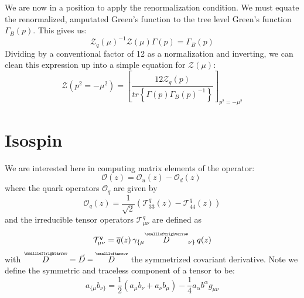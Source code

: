\documentclass[11pt, oneside]{article}   	%
\theoremstyle{definition}
\newcommand{\cev}[1]{\overset{\scriptscriptstyle\smallleftarrow}{#1}}
\newcommand{\cevvec}[1]{\overset{\scriptscriptstyle\smallleftrightarrow}{#1}}
\begin{document}
We are now in a position to apply the renormalization condition. We must equate the renormalized, amputated Green's function 
to the tree level Green's function $\Gamma_B(p)$. This gives us:
\begin{equation}
	\mathcal Z_q(\mu)^{-1}\mathcal Z(\mu) \Gamma(p) = \Gamma_B(p)
\end{equation}
Dividing by a conventional factor of 12 as a normalization and inverting, we can clean this expression up into a simple equation 
for $\mathcal Z(\mu)$:
\begin{equation}
	\mathcal Z(p^2 = -\mu^2) = \left[\frac{12\mathcal Z_q(p)}{tr\left\{\Gamma(p)\Gamma_B(p)^{-1}\right\}}\right]_{p^2 
	= -\mu^2}
\end{equation}

\section{Isospin}

We are interested here in computing matrix elements of the operator:
\begin{equation}
	\mathcal O(z) = \mathcal O_u(z) - \mathcal O_d(z)~
	\label{eq:operator_dfn}
\end{equation}
where the quark operators $\mathcal O_q$ are given by
\begin{equation}
	\mathcal O_q(z) = \frac{1}{\sqrt{2}}(\mathcal T^q_{33}(z) - \mathcal T^q_{44}(z))
\end{equation}
and the irreducible tensor operators $\mathcal T^q_{\mu\nu}$ are defined as
\begin{equation}
	\mathcal T^q_{\mu\nu} = \overline q(z)\, \gamma_{\{\mu} \cevvec{D}_{\nu\}}\, q(z)
\end{equation}
with $\cevvec D = \vec D - \cev D$ the symmetrized covariant derivative. Note we define the symmetric and traceless 
component of a tensor to be:
\begin{equation}
	a_{\{\mu}b_{\nu\}} = \frac{1}{2}(a_\mu b_\nu + a_\nu b_\mu) - \frac{1}{4}a_\alpha b^\alpha g_{\mu\nu}
\end{equation} 
\end{document}
